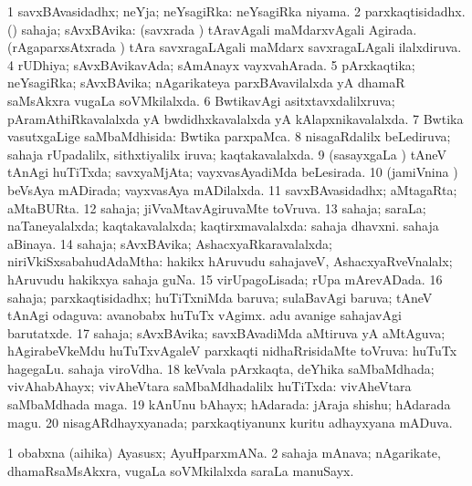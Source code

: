 \bentry
{}
\gl{\gu}
\bmng
\bnum
\num{1} savxBAvasidadhx; neYja; neYsagiRka:  neYsagiRka niyama. 
\num{2} parxkaqtisidadhx. 
 (\saM) sahaja; sAvxBAvika: 
\banum
{} (savxrada \vi) tAravAgali maMdarxvAgali Agirada. 
 (rAgaparxsAtxrada \vi) tAra savxragaLAgali maMdarx savxragaLAgali ilalxdiruva. 
\eanum
\numie
\num{4} rUDhiya; sAvxBAvikavAda; sAmAnayx vayxvahArada. 
\num{5} pArxkaqtika; neYsagiRka; sAvxBAvika; nAgarikateya parxBAvavilalxda yA dhamaR saMsAkxra \mo vugaLa soVMkilalxda. 
\num{6} BwtikavAgi asitxtavxdalilxruva; pAramAthiRkavalalxda yA bwdidhxkavalalxda yA kAlapxnikavalalxda. 
\num{7} Bwtika vasutxgaLige saMbaMdhisida:  Bwtika parxpaMca. 
\num{8} nisagaRdalilx beLediruva; sahaja rUpadalilx, sithxtiyalilx iruva; kaqtakavalalxda. 
\num{9} (sasayxgaLa \vi) tAneV tAnAgi huTiTxda; savxyaMjAta; vayxvasAyadiMda beLesirada. 
\num{10} (jamiVnina \vi) beVsAya mADirada; vayxvasAya mADilalxda. 
\num{11} savxBAvasidadhx; aMtagaRta; aMtaBURta. 
\num{12} sahaja; jiVvaMtavAgiruvaMte toVruva. 
\num{13} sahaja; saraLa; naTaneyalalxda; kaqtakavalalxda; kaqtirxmavalalxda:  sahaja dhavxni.  sahaja aBinaya. 
\num{14} sahaja; sAvxBAvika; AshacxyaRkaravalalxda; niriVkiSxsabahudAdaMtha:  hakikx hAruvudu sahajaveV, AshacxyaRveVnalalx; hAruvudu hakikxya sahaja guNa. 
\num{15} virUpagoLisada; rUpa mArevADada. 
\num{16} sahaja; parxkaqtisidadhx; huTiTxniMda baruva; sulaBavAgi baruva; tAneV tAnAgi odaguva:  avanobabx huTuTx vAgimx.  adu avanige sahajavAgi barutatxde. 
\num{17} sahaja; sAvxBAvika; savxBAvadiMda aMtiruva yA aMtAguva; hAgirabeVkeMdu huTuTxvAgaleV parxkaqti nidhaRrisidaMte toVruva:  huTuTx hagegaLu.  sahaja viroVdha. 
\num{18} keVvala pArxkaqta, deYhika saMbaMdhada; vivAhabAhayx; vivAheVtara saMbaMdhadalilx huTiTxda:  vivAheVtara saMbaMdhada maga. 
\num{19} kAnUnu bAhayx; hAdarada:  jAraja shishu; hAdarada magu. 
\num{20} nisagARdhayxyanada; parxkaqtiyanunx kuritu adhayxyana mADuva. 
\enum
\emng

\noindent
\gl{\pagu}
\bmng
\bnum
\num{1}  obabxna (aihika) Ayasusx; AyuHparxmANa. 
\num{2}  sahaja mAnava; nAgarikate, dhamaRsaMsAkxra, \mo vugaLa soVMkilalxda saraLa manuSayx. 
\enum
\emng
\eentry

